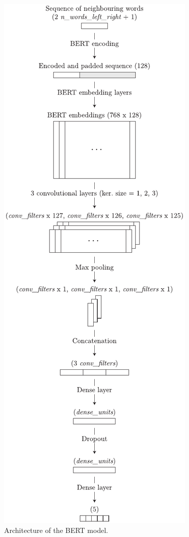\documentclass[11pt,a4paper]{article}
\begin{document}
\begin{figure}[h]
\centering
\includegraphics[width=1.0\columnwidth]{bert-model.pdf}
\caption{Architecture of the BERT model.}
\label{fig:bert-model}
\end{figure}
\end{document}
